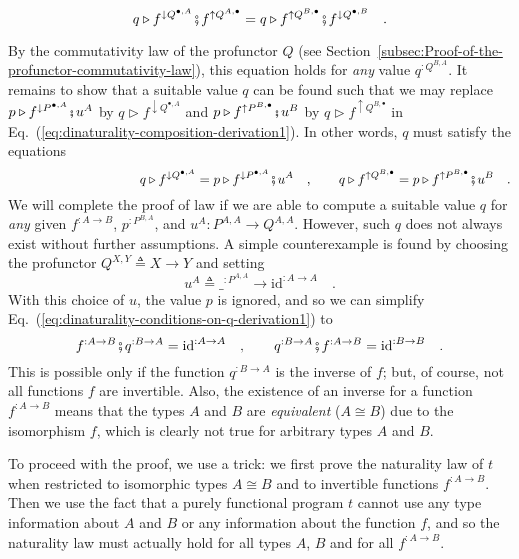 ~
\[
q\triangleright f^{\downarrow Q^{\bullet,A}}\bef f^{\uparrow Q^{A,\bullet}}=q\triangleright f^{\uparrow Q^{B,\bullet}}\bef f^{\downarrow Q^{\bullet,B}}\quad.
\]

\noindent By the commutativity law of the profunctor $Q$ (see Section~\ref{subsec:Proof-of-the-profunctor-commutativity-law}),
this equation holds for \emph{any} value $q^{:Q^{B,A}}$. It remains
to show that a suitable value $q$ can be found such that we may replace
$p\triangleright f^{\downarrow P^{\bullet,A}}\bef u^{A}$ by $q\triangleright f^{\downarrow Q^{\bullet,A}}$
and $p\triangleright f^{\uparrow P^{B,\bullet}}\bef u^{B}$ by $q\triangleright f^{\uparrow Q^{B,\bullet}}$
in Eq.~(\ref{eq:dinaturality-composition-derivation1}). In other
words, $q$ must satisfy the equations
\begin{equation}
\quad\quad\quad\quad\quad\quad\quad\quad\quad\quad q\triangleright f^{\downarrow Q^{\bullet,A}}=p\triangleright f^{\downarrow P^{\bullet,A}}\bef u^{A}\quad,\quad\quad q\triangleright f^{\uparrow Q^{B,\bullet}}=p\triangleright f^{\uparrow P^{B,\bullet}}\bef u^{B}\quad.\label{eq:dinaturality-conditions-on-q-derivation1}
\end{equation}
We will complete the proof of law if we are able to compute a suitable
value $q$ for \emph{any} given $f^{:A\rightarrow B}$, $p^{:P^{B,A}}$,
and $u^{A}:P^{A,A}\rightarrow Q^{A,A}$. However, such $q$ does not
always exist without further assumptions. A simple counterexample
is found by choosing the profunctor $Q^{X,Y}\triangleq X\rightarrow Y$
and setting
\[
u^{A}\triangleq\_^{:P^{A,A}}\rightarrow\text{id}^{:A\rightarrow A}\quad.
\]
With this choice of $u$, the value $p$ is ignored, and so we can
simplify Eq.~(\ref{eq:dinaturality-conditions-on-q-derivation1})
to
\[
f^{:A\rightarrow B}\bef q^{:B\rightarrow A}=\text{id}^{:A\rightarrow A}\quad,\quad\quad q^{:B\rightarrow A}\bef f^{:A\rightarrow B}=\text{id}^{:B\rightarrow B}\quad.
\]
This is possible only if the function $q^{:B\rightarrow A}$ is the
inverse of $f$; but, of course, not all functions $f$ are invertible.
Also, the existence of an inverse for a function $f^{:A\rightarrow B}$
means that the types $A$ and $B$ are \emph{equivalent} ($A\cong B$)
due to the isomorphism $f$, which is clearly not true for arbitrary
types $A$ and $B$.

To proceed with the proof, we use a trick: we first prove the naturality
law of $t$ when restricted to isomorphic types $A\cong B$ and to
invertible functions $f^{:A\rightarrow B}$. Then we use the fact
that a purely functional program $t$ cannot use any type information
about $A$ and $B$ or any information about the function $f$, and
so the naturality law must actually hold for all types $A$, $B$
and for all $f^{:A\rightarrow B}$.

